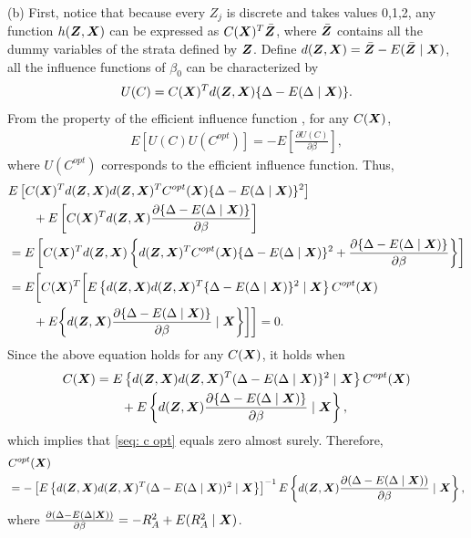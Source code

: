 \documentclass[12pt]{article}
\begin{document}
{(b) First, notice that because every $ Z_j $ is discrete and takes values 0,1,2, any function $ h(\bm{Z}, \bm X) $ can be expressed as $ C(\bm X)^T \bar{\bm{Z}} $, where $\bar  {\bm{Z}} $ contains all the dummy variables of the strata defined by $ \bm{Z} $.  Define $ d(\bm{Z}, \bm{X}) =\bar{\bm{Z}}- E(\bar{\bm{Z}}\mid\bm{X}) $,  all the influence functions of $ \beta_0 $ can be characterized  by 
\begin{align}
	U(C) = C(\bm{X})^T d(\bm{Z}, \bm{X})\{ \Delta- E(\Delta \mid \bm{X} ) \}\nonumber.
\end{align}
From the property of the efficient influence function \citep{tsiatis2007semiparametric}, for any $ C(\bm{X}) $, 
\begin{align}
	E[U(C) U(C^{opt})] = - E\left[ \frac{\partial U(C)}{\partial \beta}\right] \nonumber,
\end{align}
where $ U(C^{opt}) $ corresponds to the efficient influence function. Thus,
\begin{align}
	&E\left[  C (\bm{X})^T d(\bm{Z}, \bm{X}) d(\bm{Z}, \bm{X})^T C^{opt}(\bm{X})\{\Delta - E(\Delta \mid \bm{X} )\} ^2 \right] \nonumber\\
	&\qquad + E\left[  C(\bm{X})^T d(\bm{Z}, \bm{X})\frac{\partial \{ \Delta- E(\Delta\mid \bm{X}) \} }{\partial \beta}  \right]  \nonumber \\
	&=E\left[  C(\bm{X})^T d(\bm{Z}, \bm{X}) \left\{d(\bm{Z}, \bm{X})^T C^{opt}(\bm{X})\{\Delta - E(\Delta \mid \bm{X} )\} ^2+\frac{\partial \{ \Delta- E(\Delta\mid \bm{X}) \} }{\partial \beta} \right\} \right] \nonumber \\
	&= E\bigg[  C(\bm{X})^T\bigg[ E\left\{d(\bm{Z}, \bm{X}) d(\bm{Z}, \bm{X})^T\{\Delta - E(\Delta \mid \bm{X} )\} ^2 \mid\bm{X}\right\}C^{opt}(\bm{X}) \nonumber  \\
	&\qquad 	+E\bigg\{ d(\bm{Z}, \bm{X})\frac{\partial\{ \Delta- E(\Delta\mid \bm{X})\}}{\partial \beta} \mid\bm{X}\bigg\}\bigg] \bigg] =0 \nonumber.
\end{align}
Since the above equation holds for any $ C(\bm{X}) $, it holds when 
\begin{align}
C(\bm{X})&=  E\left\{d(\bm{Z}, \bm{X}) d(\bm{Z}, \bm{X})^T(\Delta- E(\Delta\mid\bm{X}) \} ^2 \mid\bm{X}\right\}C^{opt}(\bm{X}) \nonumber\\
&\qquad +E\left\{ d(\bm{Z}, \bm{X})\frac{\partial\{ \Delta- E(\Delta\mid \bm{X})\}}{\partial \beta} \mid\bm{X}\right\}, \label{seq: c opt}
\end{align}
which implies that \eqref{seq: c opt} equals zero almost surely. Therefore,  
\begin{align}
	&C^{opt} (\bm{X}) \\
	&= -\left[ E\left\{d(\bm{Z}, \bm{X}) d(\bm{Z}, \bm{X})^T(\Delta- E(\Delta\mid \bm{X})) ^2 \mid\bm{X}\right\}\right]^{-1} E\left\{ d(\bm{Z}, \bm{X})\frac{\partial(\Delta-E(\Delta\mid\bm{X}))}{\partial \beta} \mid\bm{X}\right\}\nonumber,
\end{align}
where $ \frac{\partial (\Delta- E(\Delta\mid \bm{X}))}{\partial \beta} = -R_A^2+ E(R_A^2\mid\bm{X})$.


}
\end{document}
